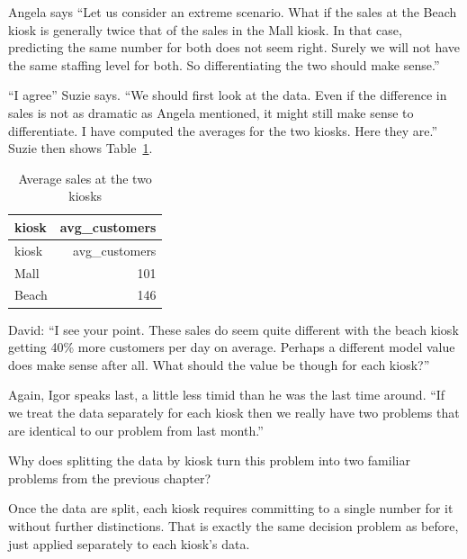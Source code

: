 \documentclass[
  12pt,
  letterpaper,
  DIV=11,
  numbers=noendperiod]{scrreprt}
\begin{document}
Angela says ``Let us consider an extreme scenario. What if the sales at
the Beach kiosk is generally twice that of the sales in the Mall kiosk.
In that case, predicting the same number for both does not seem right.
Surely we will not have the same staffing level for both. So
differentiating the two should make sense.''

``I agree'' Suzie says. ``We should first look at the data. Even if the
difference in sales is not as dramatic as Angela mentioned, it might
still make sense to differentiate. I have computed the averages for the
two kiosks. Here they are.'' Suzie then shows
Table~\ref{tbl-kiosk-avg-sales}.

\begin{longtable}[]{@{}lr@{}}
\caption{Average sales at the two
kiosks}\label{tbl-kiosk-avg-sales}\tabularnewline
\toprule\noalign{}
kiosk & avg\_customers \\
\midrule\noalign{}
\endfirsthead
\toprule\noalign{}
kiosk & avg\_customers \\
\midrule\noalign{}
\endhead
\bottomrule\noalign{}
\endlastfoot
Mall & 101 \\
Beach & 146 \\
\end{longtable}

David: ``I see your point. These sales do seem quite different with the
beach kiosk getting 40\% more customers per day on average. Perhaps a
different model value does make sense after all. What should the value
be though for each kiosk?''

Again, Igor speaks last, a little less timid than he was the last time
around. ``If we treat the data separately for each kiosk then we really
have two problems that are identical to our problem from last month.''

\begin{tcolorbox}[enhanced jigsaw, colback=white, leftrule=.75mm, toprule=.15mm, bottomtitle=1mm, breakable, coltitle=black, toptitle=1mm, title={Quick Check}, opacitybacktitle=0.6, colbacktitle=quarto-callout-note-color!10!white, arc=.35mm, left=2mm, colframe=quarto-callout-note-color-frame, titlerule=0mm, rightrule=.15mm, bottomrule=.15mm, opacityback=0]

Why does splitting the data by kiosk turn this problem into two familiar
problems from the previous chapter?

\end{tcolorbox}

\begin{tcolorbox}[enhanced jigsaw, colback=white, leftrule=.75mm, toprule=.15mm, bottomtitle=1mm, breakable, coltitle=black, toptitle=1mm, title={Suggested answer}, opacitybacktitle=0.6, colbacktitle=quarto-callout-note-color!10!white, arc=.35mm, left=2mm, colframe=quarto-callout-note-color-frame, titlerule=0mm, rightrule=.15mm, bottomrule=.15mm, opacityback=0]

Once the data are split, each kiosk requires committing to a single
number for it without further distinctions. That is exactly the same
decision problem as before, just applied separately to each kiosk's
data.

\end{tcolorbox}
\end{document}
